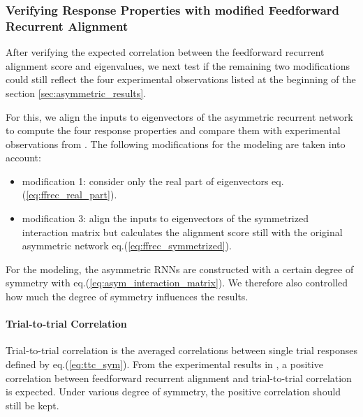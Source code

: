 \documentclass[11pt]{article}
\begin{document}
	\subsubsection{Verifying Response Properties with modified Feedforward Recurrent Alignment} \label{sec:asym_ffrec_response}
	
	After verifying the expected correlation between the feedforward recurrent alignment score and eigenvalues, we next test if the remaining two modifications could still reflect the four experimental observations listed at the beginning of the section \ref{sec:asymmetric_results}. 
	
	For this, we align the inputs to eigenvectors of the asymmetric recurrent network to compute the four response properties and compare them with experimental observations from \cite{tragenap2023nature}. The following modifications for the modeling are taken into account:
	\begin{itemize}
		\item modification 1: consider only the real part of eigenvectors eq.(\ref{eq:ffrec_real_part}). 
		\item modification 3: align the inputs to eigenvectors of the symmetrized interaction matrix but calculates the alignment score still with the original asymmetric network eq.(\ref{eq:ffrec_symmetrized}). 
	\end{itemize}
	
	For the modeling, the asymmetric RNNs are constructed with a certain degree of symmetry with eq.(\ref{eq:asym_interaction_matrix}). We therefore also controlled how much the degree of symmetry influences the results. 
	
	\paragraph{Trial-to-trial Correlation}
	
	Trial-to-trial correlation is the averaged correlations between single trial responses defined by eq.(\ref{eq:ttc_sym}). From the experimental results in \cite{tragenap2023nature}, a positive correlation between feedforward recurrent alignment and trial-to-trial correlation is expected. Under various degree of symmetry, the positive correlation should still be kept.
	
\end{document}
